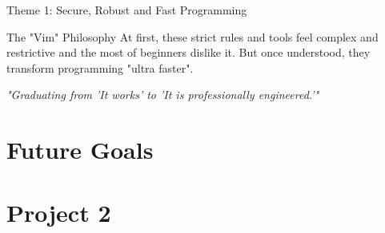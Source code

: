 \documentclass[11pt]{beamer}
\begin{document}
\begin{frame}[allowframebreaks]{Theme 1: Secure, Robust and Fast Programming}
    \begin{block}{The "Vim" Philosophy}
        At first, these strict rules and tools feel complex and restrictive and the most of beginners dislike it. But once understood, they transform programming "ultra faster".
    \end{block}

    \vspace{0.2cm}
    \centering
    \textit{"Graduating from 'It works' to 'It is professionally engineered.'"}
\end{frame}

\section{ Future Goals }
\section{Project 2}
\end{document}
